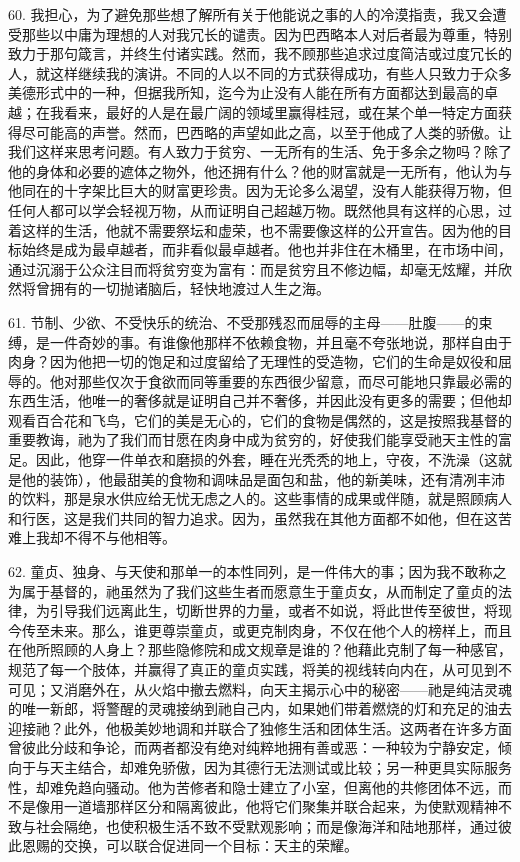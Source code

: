 60. 我担心，为了避免那些想了解所有关于他能说之事的人的冷漠指责，我又会遭受那些以中庸为理想的人对我冗长的谴责。因为巴西略本人对后者最为尊重，特别致力于那句箴言，并终生付诸实践。然而，我不顾那些追求过度简洁或过度冗长的人，就这样继续我的演讲。不同的人以不同的方式获得成功，有些人只致力于众多美德形式中的一种，但据我所知，迄今为止没有人能在所有方面都达到最高的卓越；在我看来，最好的人是在最广阔的领域里赢得桂冠，或在某个单一特定方面获得尽可能高的声誉。然而，巴西略的声望如此之高，以至于他成了人类的骄傲。让我们这样来思考问题。有人致力于贫穷、一无所有的生活、免于多余之物吗？除了他的身体和必要的遮体之物外，他还拥有什么？他的财富就是一无所有，他认为与他同在的十字架比巨大的财富更珍贵。因为无论多么渴望，没有人能获得万物，但任何人都可以学会轻视万物，从而证明自己超越万物。既然他具有这样的心思，过着这样的生活，他就不需要祭坛和虚荣，也不需要像这样的公开宣告。因为他的目标始终是成为最卓越者，而非看似最卓越者。他也并非住在木桶里，在市场中间，通过沉溺于公众注目而将贫穷变为富有：而是贫穷且不修边幅，却毫无炫耀，并欣然将曾拥有的一切抛诸脑后，轻快地渡过人生之海。\par

61. 节制、少欲、不受快乐的统治、不受那残忍而屈辱的主母——肚腹——的束缚，是一件奇妙的事。有谁像他那样不依赖食物，并且毫不夸张地说，那样自由于肉身？因为他把一切的饱足和过度留给了无理性的受造物，它们的生命是奴役和屈辱的。他对那些仅次于食欲而同等重要的东西很少留意，而尽可能地只靠最必需的东西生活，他唯一的奢侈就是证明自己并不奢侈，并因此没有更多的需要；但他却观看百合花和飞鸟，它们的美是无心的，它们的食物是偶然的，这是按照我基督的重要教诲，祂为了我们而甘愿在肉身中成为贫穷的，好使我们能享受祂天主性的富足。因此，他穿一件单衣和磨损的外套，睡在光秃秃的地上，守夜，不洗澡（这就是他的装饰），他最甜美的食物和调味品是面包和盐，他的新美味，还有清冽丰沛的饮料，那是泉水供应给无忧无虑之人的。这些事情的成果或伴随，就是照顾病人和行医，这是我们共同的智力追求。因为，虽然我在其他方面都不如他，但在这苦难上我却不得不与他相等。\par

62. 童贞、独身、与天使和那单一的本性同列，是一件伟大的事；因为我不敢称之为属于基督的，祂虽然为了我们这些生者而愿意生于童贞女，从而制定了童贞的法律，为引导我们远离此生，切断世界的力量，或者不如说，将此世传至彼世，将现今传至未来。那么，谁更尊崇童贞，或更克制肉身，不仅在他个人的榜样上，而且在他所照顾的人身上？那些隐修院和成文规章是谁的？他藉此克制了每一种感官，规范了每一个肢体，并赢得了真正的童贞实践，将美的视线转向内在，从可见到不可见；又消磨外在，从火焰中撤去燃料，向天主揭示心中的秘密——祂是纯洁灵魂的唯一新郎，将警醒的灵魂接纳到祂自己内，如果她们带着燃烧的灯和充足的油去迎接祂？此外，他极美妙地调和并联合了独修生活和团体生活。这两者在许多方面曾彼此分歧和争论，而两者都没有绝对纯粹地拥有善或恶：一种较为宁静安定，倾向于与天主结合，却难免骄傲，因为其德行无法测试或比较；另一种更具实际服务性，却难免趋向骚动。他为苦修者和隐士建立了小室，但离他的共修团体不远，而不是像用一道墙那样区分和隔离彼此，他将它们聚集并联合起来，为使默观精神不致与社会隔绝，也使积极生活不致不受默观影响；而是像海洋和陆地那样，通过彼此恩赐的交换，可以联合促进同一个目标：天主的荣耀。\par


